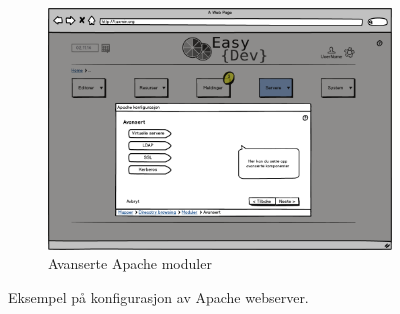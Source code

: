 \begin{figure}[p]
        \vspace{0.6cm}
        \begin{subfigure}[b]{0.48\textwidth}
                \includegraphics[width=\textwidth]
                {./img/prosessdokumentasjon/lowfi/apache5.png}
                \caption{Avanserte Apache moduler}
                \label{fig:apache5}
        \end{subfigure}
        \vspace{0.1cm}
        \caption[Konfigurasjon av Apache webserver]{Eksempel på konfigurasjon av Apache webserver.}\label{fig:lowfiapache}
\end{figure}


